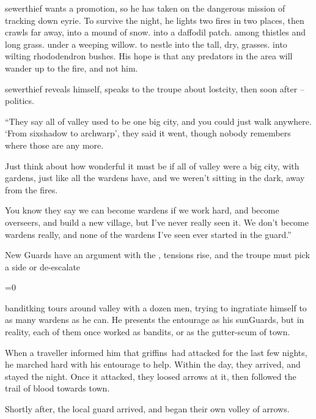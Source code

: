 \Gls{sewerthief} wants a promotion, so he has taken on the dangerous mission of tracking down  eyrie.
To survive the night, he lights two fires in two places, then crawls far away, 
\ifcase\thetemperature%
  into a mound of snow.
\or%
  into a daffodil patch.
\or%
  among thistles and long grass.
\or%
  under a weeping willow.
\or%
  to nestle into the tall, dry, grasses.
\else%
  into wilting rhododendron bushes.
\fi%
His hope is that any predators in the area will wander up to the fire, and not him.

\Gls{sewerthief} reveals himself, speaks to the troupe about \gls{lostcity}, then soon after -- politics.

\null
\begin{speechtext}
  ``They say all of \gls{valley} used to be one big city, and you could just walk anywhere.
  `From \gls{sixshadow} to \gls{archwarp}', they said it went, though nobody remembers where those are any more.

  Just think about how wonderful it must be if all of \gls{valley} were a big city, with gardens, just like all the \glspl{warden} have, and we weren't sitting in the dark, away from the fires.

  You know they say we can become \glspl{warden} if we work hard, and become overseers, and build a new \gls{village}, but I've never really seen it.
  We don't become \glspl{warden} really, and none of the \glspl{warden} I've seen ever started in the \gls{guard}.''
\end{speechtext}



{New Guards}%
{ have an argument with the , tensions rise, and the troupe must pick a side or de-escalate}%

\ifnum\value{temperature}=0
  \newcommand\localMonster{griffins}
\else
  \newcommand\localMonster{\pgls{basilisk}}
\fi

\begin{exampletext}
  \Gls{banditking} tours around \gls{valley} with a dozen men, trying to ingratiate himself to as many \glspl{warden} as he can.
  He presents the entourage as his \glspl{sunGuard}, but in reality, each of them once worked as bandits, or as the gutter-scum of \gls{town}.

  When a traveller informed him that \localMonster\ had attacked  for the last few nights, he marched hard with his entourage to help.
  Within the day, they arrived, and stayed the night.
  Once it attacked, they loosed arrows at it, then followed the trail of blood towards \gls{town}.

  Shortly after, the local \gls{guard} arrived, and began their own volley of arrows.
\end{exampletext}

